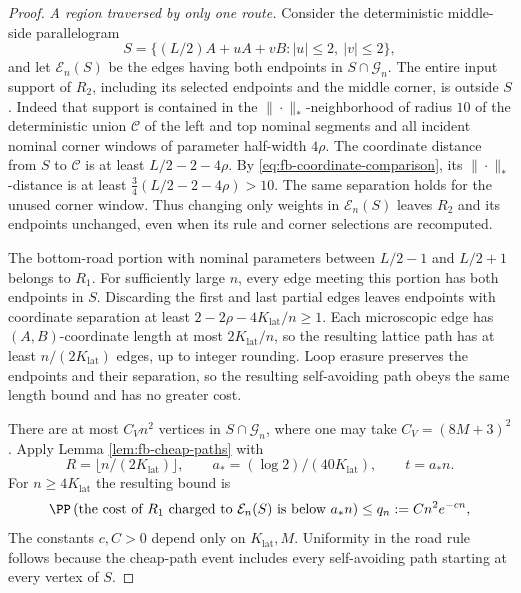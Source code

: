 \begin{proof}
\emph{A region traversed by only one route.}
Consider the deterministic middle-side parallelogram
\[
 S=\{(L/2)A+uA+vB:|u|\le2,\ |v|\le2\},
\]
and let $\mathcal E_n(S)$ be the edges having both endpoints in
$S\cap\mathcal G_n$.  The entire input support of $R_2$, including
its selected endpoints and the middle corner, is outside $S$.
Indeed that support is contained in the $\|\cdot\|_*$-neighborhood of radius $10$
of the deterministic union $\mathcal C$ of the left and top nominal
segments and all incident nominal corner windows of parameter
half-width $4\rho$.  The coordinate distance from $S$ to $\mathcal C$ is at least
$L/2-2-4\rho$.  By \eqref{eq:fb-coordinate-comparison}, its
$\|\cdot\|_*$-distance is at least
$\tfrac34(L/2-2-4\rho)>10$.  The same separation holds for the unused corner window.
Thus changing only weights in $\mathcal E_n(S)$
leaves $R_2$ and its endpoints unchanged, even when its rule and
corner selections are recomputed.

The bottom-road portion with nominal parameters between
$L/2-1$ and $L/2+1$ belongs to $R_1$.  For sufficiently large $n$,
every edge meeting this portion has both endpoints in $S$.  Discarding
the first and last partial edges leaves endpoints with coordinate
separation at least
$2-2\rho-4K_{\mathrm{lat}}/n\ge1$.  Each microscopic edge has
$(A,B)$-coordinate length at most $2K_{\mathrm{lat}}/n$, so the resulting
lattice path has at least $n/(2K_{\mathrm{lat}})$ edges, up to integer
rounding.  Loop erasure preserves the endpoints and their separation,
so the resulting self-avoiding path obeys the same length bound and
has no greater cost.

There are at most $C_V n^2$ vertices in $S\cap\mathcal G_n$, where
one may take $C_V=(8M+3)^2$.  Apply Lemma
\ref{lem:fb-cheap-paths} with
\[
 R=\lfloor n/(2K_{\mathrm{lat}})\rfloor,\qquad
 a_*=(\log2)/(40K_{\mathrm{lat}}),\qquad t=a_*n.
\]
For $n\ge4K_{\mathrm{lat}}$ the resulting bound is
\begin{equation}
 \PP \left(
 \text{the cost of $R_1$ charged to $\mathcal E_n(S)$ is below $a_*n$}
 \right)
 \le q_n:=C n^2e^{-cn},
 \label{eq:fb-middle-saving}
\end{equation}
The constants $c,C>0$ depend only on $K_{\mathrm{lat}},M$.  Uniformity
in the road rule follows because the cheap-path event includes every
self-avoiding path starting at every vertex of $S$.


\end{proof}
